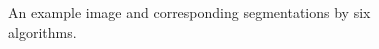 \begin{figure}[t!]
    \caption{An example image and corresponding segmentations by six algorithms.  }   
    \label{fig:img_seg_example}
\end{figure}


